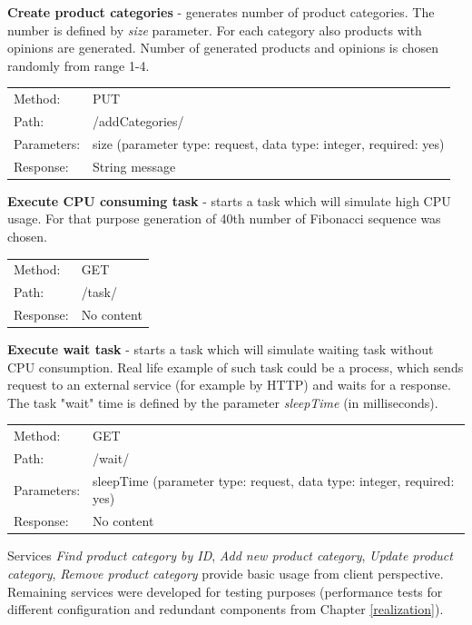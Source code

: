 \documentclass[12pt,a4paper]{article}
\begin{document}
\noindent\textbf{Create product categories} - generates number of product categories. The number is defined by \textit{size} parameter. For each category also products with opinions are generated. Number of generated products and opinions is chosen randomly from range 1-4. 

{\renewcommand{\arraystretch}{1}
  \begin{tabular}{ll}
  Method: & PUT \\
  Path: & /addCategories/ \\
  Parameters: & size (parameter type: request, data type: integer, required: yes)\\
  Response: & String message  \\
  \end{tabular} \vspace{5mm}
}

\noindent\textbf{Execute CPU consuming task} - starts a task which will simulate high CPU usage. For that purpose generation of 40th number of Fibonacci sequence was chosen. 

{\renewcommand{\arraystretch}{1}
  \begin{tabular}{ll}
  Method: & GET \\
  Path: & /task/ \\
  Response: & No content  \\
  \end{tabular} \vspace{2mm}
}

\noindent\textbf{Execute wait task} - starts a task which will simulate waiting task without CPU consumption. Real life example of such task could be a process, which sends request to an external service (for example by HTTP) and waits for a response. The task "wait" time is defined by the parameter \textit{sleepTime} (in milliseconds). 

{\renewcommand{\arraystretch}{1}
  \begin{tabular}{ll}
  Method: & GET \\
  Path: & /wait/ \\
  Parameters: & sleepTime (parameter type: request, data type: integer, required: yes)\\
  Response: & No content  \\
  \end{tabular} \vspace{5mm}
}
  
Services \textit{Find product category by ID}, \textit{Add new product category}, \textit{Update product category}, \textit{Remove product category} provide basic usage from client perspective. Remaining services were developed for testing purposes (performance tests for different configuration and redundant components from Chapter \ref{realization}).
  
\end{document}
